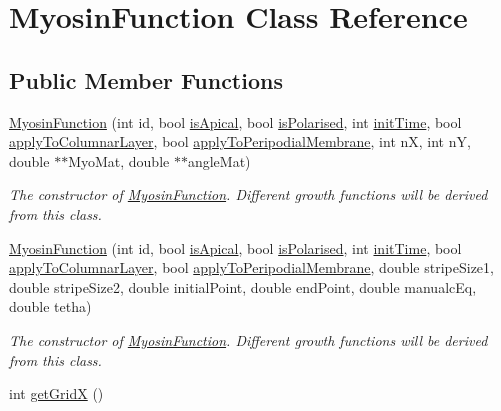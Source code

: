 \hypertarget{classMyosinFunction}{}\section{Myosin\+Function Class Reference}
\label{classMyosinFunction}
\subsection*{Public Member Functions}
\begin{DoxyCompactItemize}
\item 
\hyperlink{classMyosinFunction_a25c83e1aaafc9d029e6c551008114ef7}{Myosin\+Function} (int id, bool \hyperlink{classMyosinFunction_a413c9a88624a97f6483efebdc5ab6fac}{is\+Apical}, bool \hyperlink{classMyosinFunction_a66bf31a5b46a19e67691d67b25c03852}{is\+Polarised}, int \hyperlink{classMyosinFunction_a5bf0e10f1e37ef01762fe72305d2e4d2}{init\+Time}, bool \hyperlink{classMyosinFunction_a6a978e5577af3f6b56edda5fd825d89c}{apply\+To\+Columnar\+Layer}, bool \hyperlink{classMyosinFunction_a76b32da8850a97ca48046d34542ee1c0}{apply\+To\+Peripodial\+Membrane}, int n\+X, int n\+Y, double $\ast$$\ast$Myo\+Mat, double $\ast$$\ast$angle\+Mat)
\begin{DoxyCompactList}\small\item\em The constructor of \hyperlink{classMyosinFunction}{Myosin\+Function}. Different growth functions will be derived from this class. \end{DoxyCompactList}\item 
\hyperlink{classMyosinFunction_a9a1d0f2da5bf8c9f3e9f48d88297c3fd}{Myosin\+Function} (int id, bool \hyperlink{classMyosinFunction_a413c9a88624a97f6483efebdc5ab6fac}{is\+Apical}, bool \hyperlink{classMyosinFunction_a66bf31a5b46a19e67691d67b25c03852}{is\+Polarised}, int \hyperlink{classMyosinFunction_a5bf0e10f1e37ef01762fe72305d2e4d2}{init\+Time}, bool \hyperlink{classMyosinFunction_a6a978e5577af3f6b56edda5fd825d89c}{apply\+To\+Columnar\+Layer}, bool \hyperlink{classMyosinFunction_a76b32da8850a97ca48046d34542ee1c0}{apply\+To\+Peripodial\+Membrane}, double stripe\+Size1, double stripe\+Size2, double initial\+Point, double end\+Point, double manualc\+Eq, double tetha)
\begin{DoxyCompactList}\small\item\em The constructor of \hyperlink{classMyosinFunction}{Myosin\+Function}. Different growth functions will be derived from this class. \end{DoxyCompactList}\item 
\hypertarget{classMyosinFunction_a81060aaa6923f43a5a9e2dcbb11a9ac6}{}int \hyperlink{classMyosinFunction_a81060aaa6923f43a5a9e2dcbb11a9ac6}{get\+Grid\+X} ()\label{classMyosinFunction_a81060aaa6923f43a5a9e2dcbb11a9ac6}


\end{DoxyCompactItemize}
